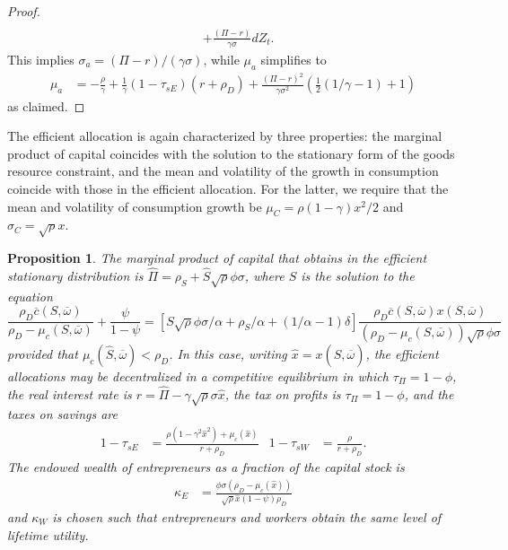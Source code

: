 \documentclass[11pt]{article}
\theoremstyle{plain}
\newtheorem{prop}[thm]{Proposition}
\theoremstyle{definition} %
\begin{document}
\begin{proof}
\begin{align*}
\\ & + \frac{(\Pi-r)}{\gamma\sigma}dZ_t.
\end{align*}
This implies $\sigma_a = (\Pi - r)/(\gamma \sigma)$, while $\mu_a$ simplifies to 
\begin{align*}
\mu_a & =  - \frac{\rho}{\gamma} + \frac{1}{\gamma}(1-\tau_{sE})(r+\rho_D) + \frac{{\left(\Pi - r\right)}^2}{\gamma\sigma^2}{\left( \frac{1}{2}(1/\gamma-1) +  1\right)}
\end{align*}
as claimed.
\end{proof}

The efficient allocation is again characterized by three properties: the marginal product of capital coincides with the solution to the stationary form of the goods resource constraint, and the mean and volatility of the growth in consumption coincide with those in the efficient allocation. For the latter, we require that the mean and volatility of consumption growth be $\mu_C = \rho(1-\gamma)x^2/2$ and $\sigma_C = \sqrt{\rho} x$. 

\begin{prop} \label{propCRRA}
The marginal product of capital that obtains in the efficient stationary distribution is $\hat{\Pi} = \rho_S + \hat{S} \sqrt{\rho} \phi \sigma$, where $\hat{S}$ is the solution to the equation
\begin{equation}
\frac{\rho_D\overline{c}(S, \overline{\omega})}{\rho_D - \mu_c(S, \overline{\omega})} + \frac{\psi}{1-\psi} = {\left[S\sqrt{\rho} \phi \sigma/\alpha + \rho_S/\alpha + (1/\alpha-1)\delta \right]} \frac{\rho_D \overline{c}(S, \overline{\omega}) x(S, \overline{\omega})}{(\rho_D - \mu_c(S, \overline{\omega}))\sqrt{\rho}\phi \sigma}
\label{STATpi}
\end{equation}
provided that $\mu_c(\hat{S}, \overline{\omega}) < \rho_D$. In this case, writing $\hat{x} = x(\hat{S},\overline{\omega})$, the efficient allocations may be decentralized in a competitive equilibrium in which $\tau_{\Pi} = 1-\phi$, the real interest rate is $r = \hat{\Pi} - \gamma \sqrt{\rho} \sigma \hat{x}$, the tax on profits is $\tau_{\Pi} = 1 - \phi$, and the taxes on savings are
\begin{align*}
1 - \tau_{sE} & = \frac{\rho(1 - \gamma^2\hat{x}^2) + \mu_c(\hat{x})}{r + \rho_D} &
1 - \tau_{sW} & = \frac{\rho}{r + \rho_D}.
\end{align*}
The endowed wealth of entrepreneurs as a fraction of the capital stock is
\begin{align*}
\kappa_E & = \frac{\phi \sigma (\rho_D - \mu_c(\hat{x}))}{\sqrt{\rho} \hat{x} (1-\psi) \rho_D} 
\end{align*}
and $\kappa_W$ is chosen such that entrepreneurs and workers obtain the same level of lifetime utility.
\end{prop}
\end{document}
